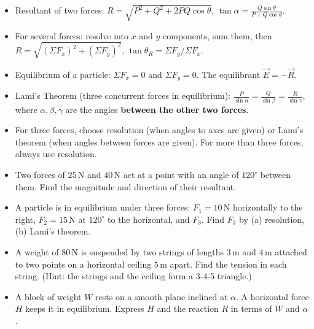 \documentclass[11pt]{article}
\newcounter{popsec}
\newcounter{popsub}
\newcommand{\courssub}[1]{%
  \stepcounter{popsub}%
  \par\vspace{9pt}\noindent{\popxbold\fontsize{11.5}{13}\selectfont\color{popink}{\color{poporange}\thepopsec.\thepopsub}\hspace{6pt}#1}\par\nopagebreak\vspace{4pt}
}
\begin{document}
\courssub{Summary and Key Points}

\begin{aretenir}
\begin{itemize}
\item Resultant of two forces: \(R = \sqrt{P^2+Q^2+2PQ\cos\theta}\), \(\tan\alpha = \frac{Q\sin\theta}{P+Q\cos\theta}\).
\item For several forces: resolve into \(x\) and \(y\) components, sum them, then \(R = \sqrt{(\Sigma F_x)^2+(\Sigma F_y)^2}\), \(\tan\theta_R = \Sigma F_y/\Sigma F_x\).
\item Equilibrium of a particle: \(\Sigma F_x = 0\) and \(\Sigma F_y = 0\). The equilibrant \(\vec{E} = -\vec{R}\).
\item Lami's Theorem (three concurrent forces in equilibrium): \(\frac{P}{\sin\alpha} = \frac{Q}{\sin\beta} = \frac{R}{\sin\gamma}\), where \(\alpha,\beta,\gamma\) are the angles \textbf{between the other two forces}.
\item For three forces, choose resolution (when angles to axes are given) or Lami's theorem (when angles between forces are given). For more than three forces, always use resolution.
\end{itemize}
\end{aretenir}

\begin{exercice}
\begin{itemize}
\item Two forces of \(25\,\mathrm{N}\) and \(40\,\mathrm{N}\) act at a point with an angle of \(120^\circ\) between them. Find the magnitude and direction of their resultant.
\item A particle is in equilibrium under three forces: \(F_1 = 10\,\mathrm{N}\) horizontally to the right, \(F_2 = 15\,\mathrm{N}\) at \(120^\circ\) to the horizontal, and \(F_3\). Find \(F_3\) by (a) resolution, (b) Lami's theorem.
\item A weight of \(80\,\mathrm{N}\) is suspended by two strings of lengths \(3\,\mathrm{m}\) and \(4\,\mathrm{m}\) attached to two points on a horizontal ceiling \(5\,\mathrm{m}\) apart. Find the tension in each string. (Hint: the strings and the ceiling form a 3-4-5 triangle.)
\item A block of weight \(W\) rests on a smooth plane inclined at \(\alpha\). A horizontal force \(H\) keeps it in equilibrium. Express \(H\) and the reaction \(R\) in terms of \(W\) and \(\alpha\).
\end{itemize}
\end{exercice}
\end{document}
